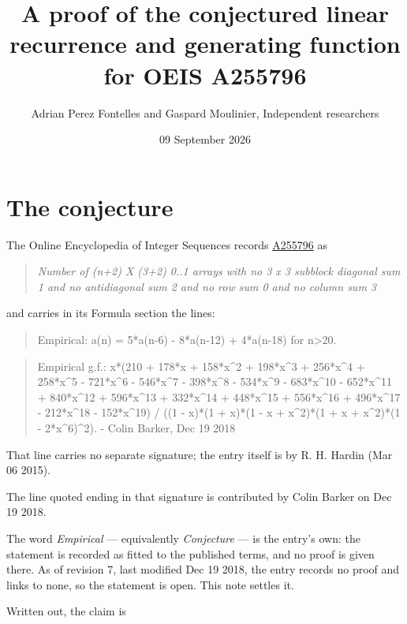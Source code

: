 \documentclass[11pt]{article}
\title{A proof of the conjectured linear recurrence and generating function for OEIS A255796}
\author{Adrian Perez Fontelles and Gaspard Moulinier, Independent researchers}
\date{09 September 2026}
\theoremstyle{definition}
\begin{document}
\maketitle
\section{The conjecture}

The Online Encyclopedia of Integer Sequences records \href{https://oeis.org/A255796}{A255796} as

\begin{quote}\itshape Number of (n+2) X (3+2) 0..1 arrays with no 3 x 3 subblock diagonal sum 1 and no antidiagonal sum 2 and no row sum 0 and no column sum 3\end{quote}

and carries in its Formula section the lines:

\begin{quote}\ttfamily Empirical: a(n) = 5*a(n-6) - 8*a(n-12) + 4*a(n-18) for n>20.\end{quote}

\begin{quote}\ttfamily Empirical g.f.: x*(210 + 178*x + 158*x\textasciicircum{}2 + 198*x\textasciicircum{}3 + 256*x\textasciicircum{}4 + 258*x\textasciicircum{}5 - 721*x\textasciicircum{}6 - 546*x\textasciicircum{}7 - 398*x\textasciicircum{}8 - 534*x\textasciicircum{}9 - 683*x\textasciicircum{}10 - 652*x\textasciicircum{}11 + 840*x\textasciicircum{}12 + 596*x\textasciicircum{}13 + 332*x\textasciicircum{}14 + 448*x\textasciicircum{}15 + 556*x\textasciicircum{}16 + 496*x\textasciicircum{}17 - 212*x\textasciicircum{}18 - 152*x\textasciicircum{}19) / ((1 - x)*(1 + x)*(1 - x + x\textasciicircum{}2)*(1 + x + x\textasciicircum{}2)*(1 - 2*x\textasciicircum{}6)\textasciicircum{}2). - Colin Barker, Dec 19 2018\end{quote}

That line carries no separate signature; the entry itself is by R. H. Hardin (Mar 06 2015).

The line quoted ending in that signature is contributed by Colin Barker on Dec 19 2018.

The word {\itshape Empirical} --- equivalently {\itshape Conjecture} --- is the entry's own: the statement is recorded as fitted to the published terms, and no proof is given there. As of revision 7, last modified Dec 19 2018, the entry records no proof and links to none, so the statement is open. This note settles it.

Written out, the claim is
\end{document}
